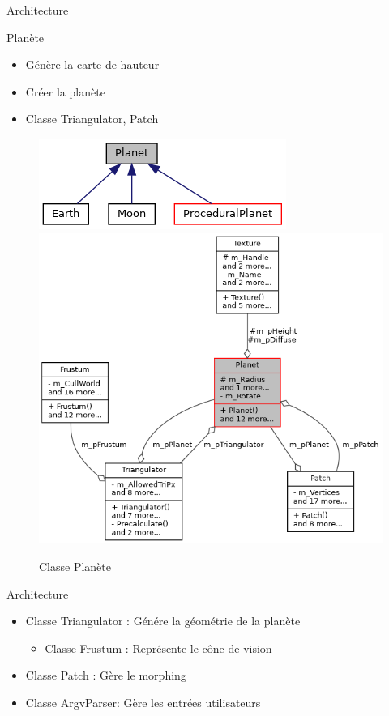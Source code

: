\begin{frame}{Architecture}

Planète
\begin{itemize}
    \item Génère la carte de hauteur
    \item Créer la planète
    \item Classe Triangulator, Patch
\end{itemize}

\begin{figure}
   \includegraphics[scale=0.40]{img/planet_inh.png}
   \includegraphics[scale=0.30]{img/planet_uml.png}
   \caption{Classe Planète}
\end{figure}

\end{frame}

\begin{frame}{Architecture}

\begin{itemize}
    \item Classe Triangulator : Génére la géométrie de la planète
    \begin{itemize}
        \item Classe Frustum : Représente le cône de vision    
    \end{itemize}
    \item Classe Patch : Gère le morphing
    \item Classe ArgvParser: Gère les entrées utilisateurs
\end{itemize}
\end{frame}


